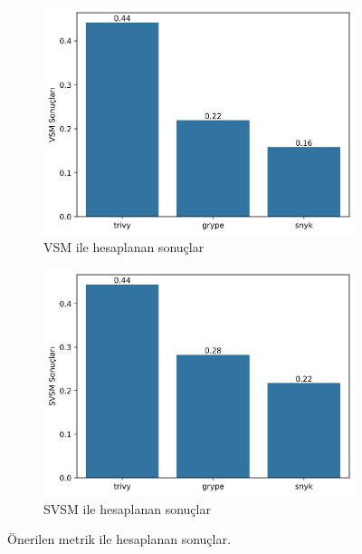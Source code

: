 \begin{figure}[!htbp]
	\centering
	\begin{subfigure}[]{\linewidth/2}
		\includegraphics[width=\linewidth]{images/s1/VSM.png}
		\caption{VSM ile hesaplanan sonuçlar}\label{fig:vsm}
	\end{subfigure}%
	\begin{subfigure}[]{\linewidth/2}
		\includegraphics[width=\linewidth]{images/s1/SVSM.png}
		\caption{SVSM ile hesaplanan sonuçlar}\label{fig:svms}
	\end{subfigure}

	\caption{Önerilen metrik ile hesaplanan sonuçlar.}\label{fig:proposed-metric-results}
\end{figure}

